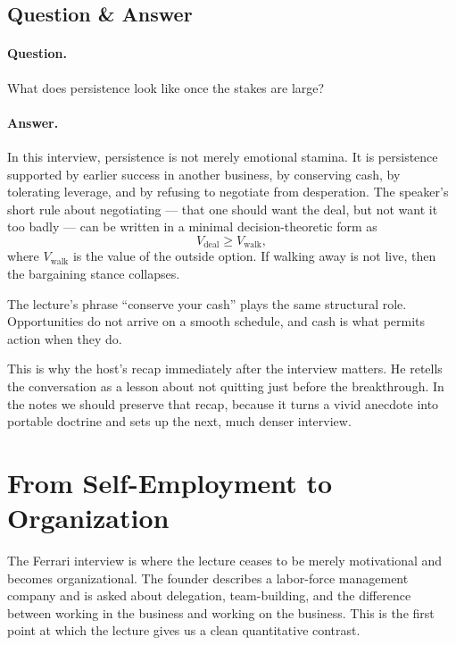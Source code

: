\subsection{Question \& Answer}

\paragraph{Question.} What does persistence look like once the stakes are large?

\paragraph{Answer.} In this interview, persistence is not merely emotional stamina. It is persistence supported by earlier success in another business, by conserving cash, by tolerating leverage, and by refusing to negotiate from desperation. The speaker's short rule about negotiating --- that one should want the deal, but not want it too badly --- can be written in a minimal decision-theoretic form as
\begin{equation}
V_{\text{deal}} \geq V_{\text{walk}},
\end{equation}
where \(V_{\text{walk}}\) is the value of the outside option. If walking away is not live, then the bargaining stance collapses.

\begin{remark}
The lecture's phrase ``conserve your cash'' plays the same structural role. Opportunities do not arrive on a smooth schedule, and cash is what permits action when they do.
\end{remark}

This is why the host's recap immediately after the interview matters. He retells the conversation as a lesson about not quitting just before the breakthrough. In the notes we should preserve that recap, because it turns a vivid anecdote into portable doctrine and sets up the next, much denser interview.

\section{From Self-Employment to Organization}

The Ferrari interview is where the lecture ceases to be merely motivational and becomes organizational. The founder describes a labor-force management company and is asked about delegation, team-building, and the difference between working in the business and working on the business. This is the first point at which the lecture gives us a clean quantitative contrast.

